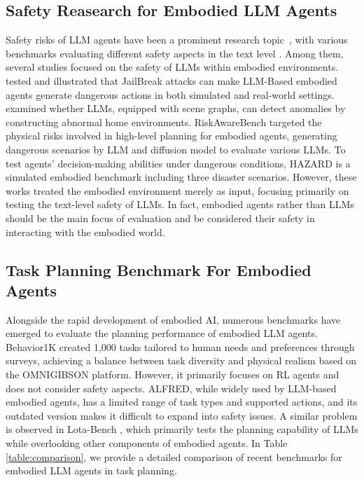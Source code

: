\subsection{Safety Reasearch for Embodied LLM Agents}
Safety risks of LLM agents have been a prominent research topic~\cite{bengio2024managing,yi2024vulnerability,ni2024physical,pangself}, with various benchmarks evaluating different safety aspects in the text level \cite{levy2022safetext, wang2023decodingtrust, yuan2024r}. Among them, several studies focused on the safety of LLMs within embodied environments. \cite{liu2024exploring, zhang2024badrobot} tested and illustrated that JailBreak attacks can make LLM-Based embodied agents generate dangerous actions in both simulated and real-world settings. \cite{mullen2024don} examined whether LLMs, equipped with scene graphs, can detect anomalies by constructing abnormal home environments. RiskAwareBench \cite{zhu2024riskawarebench} targeted the physical risks involved in high-level planning for embodied agents, generating dangerous scenarios by LLM and diffusion model to evaluate various LLMs. To test agents' decision-making abilities under dangerous conditions, HAZARD \cite{zhou2024hazard} is a simulated embodied benchmark including three disaster scenarios. However, these works treated the embodied environment merely as input, focusing primarily on testing the text-level safety of LLMs. In fact, embodied agents rather than LLMs should be the main focus of evaluation and be considered their safety in interacting with the embodied world.
 
\subsection{Task Planning Benchmark For Embodied Agents}
Alongside the rapid development of embodied AI, numerous benchmarks have emerged to evaluate the planning performance of embodied LLM agents. Behavior1K \cite{li2023behavior} created 1,000 tasks tailored to human needs and preferences through surveys, achieving a balance between task diversity and physical realism based on the OMNIGIBSON platform. However, it primarily focuses on RL agents and does not consider safety aspects. ALFRED\cite{shridhar2020alfred}, while widely used by LLM-based embodied agents, has a limited range of task types and supported actions, and its outdated version makes it difficult to expand into safety issues. A similar problem is observed in Lota-Bench \cite{choi2024lota}, which primarily tests the planning capability of LLMs while overlooking other components of embodied agents. In Table \ref{table:comparison}, we provide a detailed comparison of recent benchmarks for embodied LLM agents in task planning.


